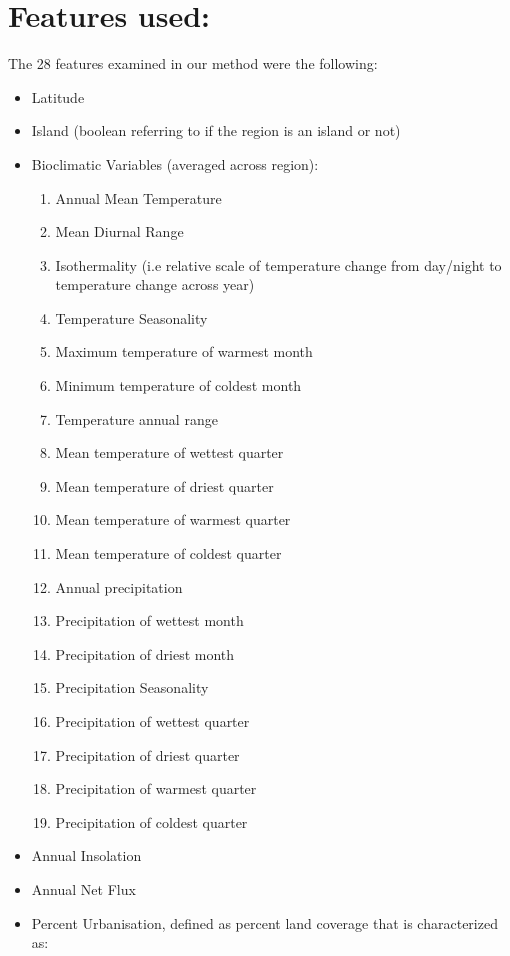 \documentclass[prl,showpacs,superscriptaddress,twocolumn,longbibliography]{revtex4-1}
\begin{document}
\chapter{Features used:}\label{appendix:raw}
The 28 features examined in our method were the following:
\begin{itemize}
\item Latitude
\item Island (boolean referring to if the region is an island or not)
\item Bioclimatic Variables (averaged across region)\cite{fick_wordlclim_2017}:
\begin{enumerate}
	\item Annual Mean Temperature
	\item Mean Diurnal Range
	\item Isothermality (i.e relative scale of temperature change from day/night to temperature change across year)
	\item Temperature Seasonality
	\item Maximum temperature of warmest month
	\item Minimum temperature of coldest month
	\item Temperature annual range
	\item Mean temperature of wettest quarter
	\item Mean temperature of driest quarter
	\item Mean temperature of warmest quarter
	\item Mean temperature of coldest quarter
	\item Annual precipitation
	\item Precipitation of wettest month
	\item Precipitation of driest month
	\item Precipitation Seasonality
	\item Precipitation of wettest quarter
	\item Precipitation of driest quarter
	\item Precipitation of warmest quarter
	\item Precipitation of coldest quarter
\end{enumerate}
\item Annual Insolation\cite{nasa_insol}
\item Annual Net Flux\cite{nasa_netflux}
\item Percent Urbanisation, defined as percent land coverage that is characterized as:
\begin{itemize}

\end{itemize}
\end{itemize}
\end{document}
